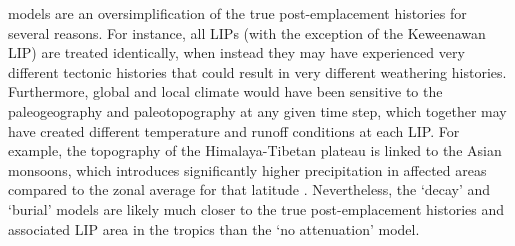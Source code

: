 \documentclass[11pt,letterpaper]{article}
\begin{document}
models are an oversimplification of the true post-emplacement histories for several reasons. For instance, all LIPs (with the exception of the Keweenawan LIP) are treated identically, when instead they may have experienced very different tectonic histories that could result in very different weathering histories. Furthermore, global and local climate would have been sensitive to the paleogeography and paleotopography at any given time step, which together may have created different temperature and runoff conditions at each LIP. For example, the topography of the Himalaya-Tibetan plateau is linked to the Asian monsoons, which introduces significantly higher precipitation in affected areas compared to the zonal average for that latitude \citep{Zhisheng2001a}. Nevertheless, the `decay' and `burial' models are likely much closer to the true post-emplacement histories and associated LIP area in the tropics than the `no attenuation' model.
\end{document}
